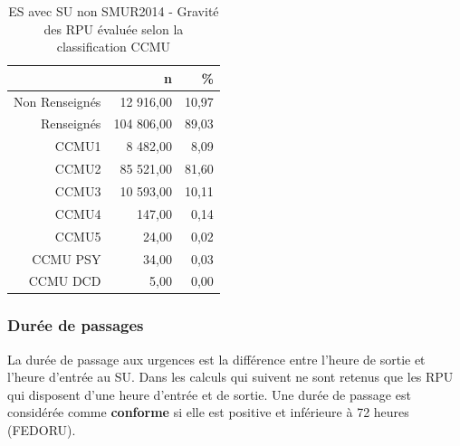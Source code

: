 \documentclass[]{article}
\begin{document}
\begin{itemize}
  \begin{table}[ht]
  \centering
  \begin{tabular}{rrr}
    \hline
   & n & \% \\ 
    \hline
  Non Renseignés & 12 916,00 & 10,97 \\ 
    Renseignés & 104 806,00 & 89,03 \\ 
    CCMU1 & 8 482,00 & 8,09 \\ 
    CCMU2 & 85 521,00 & 81,60 \\ 
    CCMU3 & 10 593,00 & 10,11 \\ 
    CCMU4 & 147,00 & 0,14 \\ 
    CCMU5 & 24,00 & 0,02 \\ 
    CCMU PSY & 34,00 & 0,03 \\ 
    CCMU DCD & 5,00 & 0,00 \\ 
     \hline
  \end{tabular}
  \caption{ES avec SU non SMUR2014 - Gravité des RPU évaluée selon la classification CCMU} 
  \end{table}
\end{itemize}

\subsubsection{Durée de passages}\label{duree-de-passages-3}

La durée de passage aux urgences est la différence entre l'heure de
sortie et l'heure d'entrée au SU. Dans les calculs qui suivent ne sont
retenus que les RPU qui disposent d'une heure d'entrée et de sortie. Une
durée de passage est considérée comme \textbf{conforme} si elle est
positive et inférieure à 72 heures (FEDORU).
\end{document}
